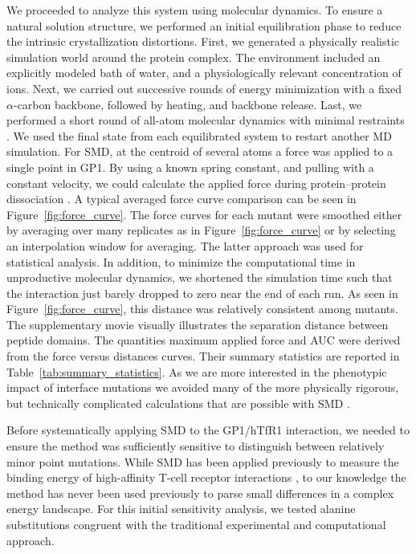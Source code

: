\documentclass[journal=jacsat,manuscript=article]{achemso}
\begin{document}
We proceeded to analyze this system using molecular dynamics. To ensure a natural solution structure, we performed an initial equilibration phase to reduce the intrinsic crystallization distortions. First, we generated a physically realistic simulation world around the protein complex. The environment included an explicitly modeled bath of water, and a physiologically relevant concentration of ions. Next, we carried out successive rounds of energy minimization with a fixed $\alpha$-carbon backbone, followed by heating, and backbone release. Last, we performed a short round of all-atom molecular dynamics with minimal restraints \cite{Cuendet2008}. We used the final state from each equilibrated system to restart another MD simulation. For SMD, at the centroid of several atoms a force was applied to a single point in GP1. By using a known spring constant, and pulling with a constant velocity, we could calculate the applied force during protein--protein dissociation \cite{Cuendet2008,Cuendet2011}. A typical averaged force curve comparison can be seen in Figure~\ref{fig:force_curve}. The force curves for each mutant were smoothed either by averaging over many replicates as in Figure~\ref{fig:force_curve} or by selecting an interpolation window for averaging. The latter approach was used for statistical analysis. In addition, to minimize the computational time in unproductive molecular dynamics, we shortened the simulation time such that the interaction just barely dropped to zero near the end of each run. As seen in Figure~\ref{fig:force_curve}, this distance was relatively consistent among mutants. The supplementary movie visually illustrates the separation distance between peptide domains. The quantities maximum applied force and AUC were derived from the force versus distances curves. Their summary statistics are reported in Table~\ref{tab:summary_statistics}. As we are more interested in the phenotypic impact of interface mutations we avoided many of the more physically rigorous, but technically complicated calculations that are possible with SMD \cite{Is2001A,Is2001B}.

Before systematically applying SMD to the GP1/hTfR1 interaction, we needed to ensure the method was sufficiently sensitive to distinguish between relatively minor point mutations. While SMD has been applied previously to measure the binding energy of high-affinity T-cell receptor interactions \cite{Cuendet2008,Cuendet2011}, to our knowledge the method has never been used previously to parse small differences in a complex energy landscape. For this initial sensitivity analysis, we tested alanine substitutions congruent with the traditional experimental and computational approach. 
\end{document}
